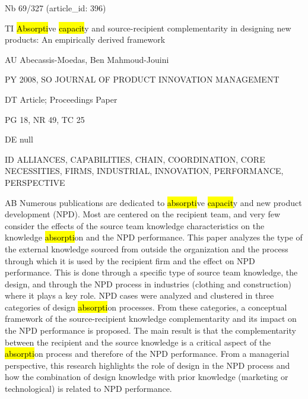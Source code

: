 \documentclass[a4paper]{article}
\begin{document}
\vspace*{-2cm}
Nb \tabto{0cm}69/327 (article\_id: 396)\par
TI \tabto{0cm}\hl{Absorpti}ve \hl{capacit}y and source-recipient complementarity in designing new products: An empirically derived framework\par
AU \tabto{0cm}Abecassis-Moedas, Ben Mahmoud-Jouini\par
PY \tabto{0cm}2008, SO JOURNAL OF PRODUCT INNOVATION MANAGEMENT\par
DT \tabto{0cm}Article; Proceedings Paper\par
PG \tabto{0cm}18, NR 49, TC 25\par
DE \tabto{0cm}null\par
ID \tabto{0cm}ALLIANCES, CAPABILITIES, CHAIN, COORDINATION, CORE NECESSITIES, FIRMS, INDUSTRIAL, INNOVATION, PERFORMANCE, PERSPECTIVE\par
AB \tabto{0cm}Numerous publications are dedicated to \hl{absorpti}ve \hl{capacit}y and new product development (NPD). Most are centered on the recipient team, and very few consider the effects of the source team knowledge characteristics on the knowledge \hl{absorpti}on and the NPD performance. This paper analyzes the type of the external knowledge sourced from outside the organization and the process through which it is used by the recipient firm and the effect on NPD performance. This is done through a specific type of source team knowledge, the design, and through the NPD process in industries (clothing and construction) where it plays a key role. NPD cases were analyzed and clustered in three categories of design \hl{absorpti}on processes. From these categories, a conceptual framework of the source-recipient knowledge complementarity and its impact on the NPD performance is proposed. The main result is that the complementarity between the recipient and the source knowledge is a critical aspect of the \hl{absorpti}on process and therefore of the NPD performance. From a managerial perspective, this research highlights the role of design in the NPD process and how the combination of design knowledge with prior knowledge (marketing or technological) is related to NPD performance.\par
\clearpage
\end{document}
